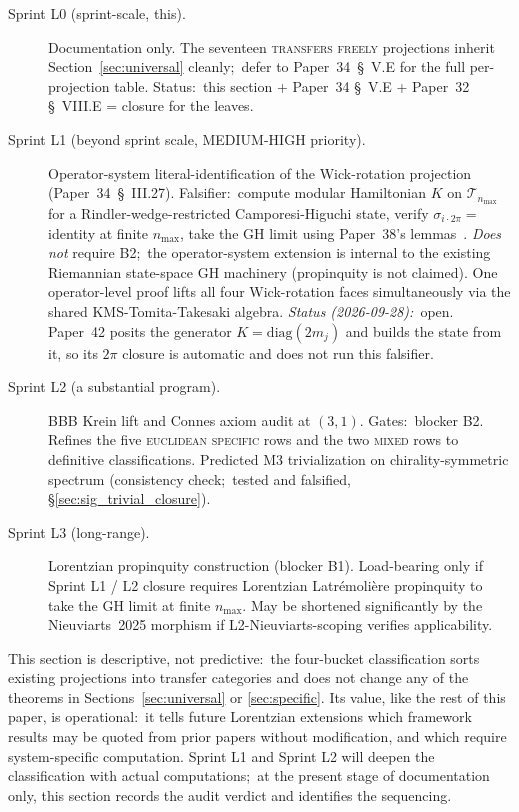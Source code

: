 \documentclass[twocolumn,pra,amsmath,amssymb,superscriptaddress]{revtex4-2}
\begin{document}
\begin{description}
\item[Sprint L0 (sprint-scale, this).]  Documentation only.  The
  seventeen \textsc{transfers freely} projections inherit
  Section~\ref{sec:universal} cleanly;\ defer to Paper~34~\S~V.E
  for the full per-projection table.  Status:\ this section + Paper~34
  \S~V.E + Paper~32 \S~VIII.E = closure for the leaves.
\item[Sprint L1 (beyond sprint scale, MEDIUM-HIGH priority).]
  Operator-system literal-identification of the Wick-rotation
  projection (Paper~34~\S~III.27).  Falsifier:\ compute modular
  Hamiltonian $K$ on $\mathcal{T}_{n_{\max}}$ for a Rindler-wedge-restricted
  Camporesi-Higuchi state, verify $\sigma_{i \cdot 2\pi} = $ identity
  at finite $n_{\max}$, take the GH limit using Paper~38's
  lemmas~\cite{paper38}.  \emph{Does not} require B2;\ the
  operator-system extension is internal to the existing Riemannian
  state-space GH machinery (propinquity is not claimed).  One operator-level proof lifts all four
  Wick-rotation faces simultaneously via the shared KMS-Tomita-Takesaki
  algebra.  \emph{Status (2026-09-28):}\ open.  Paper~42 posits the
  generator $K = \mathrm{diag}(2m_j)$ and builds the state from it, so
  its $2\pi$ closure is automatic and does not run this falsifier.
\item[Sprint L2 (a substantial program).]  BBB Krein lift and Connes axiom audit
  at $(3, 1)$.  Gates:\ blocker B2.  Refines the five
  \textsc{euclidean specific} rows and the two \textsc{mixed} rows to
  definitive classifications.  Predicted M3 trivialization on
  chirality-symmetric spectrum (consistency check;\ tested and
  falsified, \S\ref{sec:sig_trivial_closure}).
\item[Sprint L3 (long-range).]  Lorentzian propinquity construction
  (blocker B1).  Load-bearing only if Sprint L1 / L2 closure requires
  Lorentzian Latr\'emoli\`ere propinquity to take the GH limit at
  finite $n_{\max}$.  May be shortened significantly by the
  Nieuviarts~2025 morphism if L2-Nieuviarts-scoping verifies
  applicability.
\end{description}

This section is descriptive, not predictive:\ the four-bucket
classification sorts existing projections into transfer categories
and does not change any of the theorems in
Sections~\ref{sec:universal} or \ref{sec:specific}.
Its value, like the rest of this paper, is operational:\ it tells
future Lorentzian extensions which framework results may be quoted
from prior papers without modification, and which require
system-specific computation.  Sprint L1 and Sprint L2 will deepen the
classification with actual computations;\ at the present stage of
documentation only, this section records the audit verdict and
identifies the sequencing.
\end{document}
